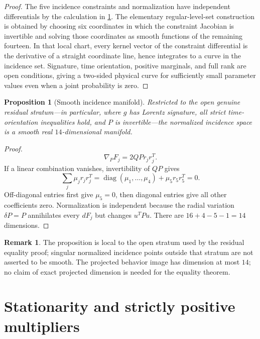 \documentclass[11pt]{article}
\newtheorem{proposition}[theorem]{Proposition}
\theoremstyle{definition}
\newtheorem{remark}[theorem]{Remark}
\begin{document}
\begin{proof}
The five incidence constraints and normalization have independent
differentials by the calculation in \cref{prop:smooth}. The elementary
regular-level-set construction is obtained by choosing six coordinates in
which the constraint Jacobian is invertible and solving those coordinates as
smooth functions of the remaining fourteen. In that local chart, every
kernel vector of the constraint differential is the derivative of a straight
coordinate line, hence integrates to a curve in the incidence set.
Signature, time orientation, positive marginals, and full rank are open
conditions, giving a two-sided physical curve for sufficiently small
parameter values even when a joint probability is zero.
\end{proof}

\begin{proposition}[Smooth incidence manifold]
\label{prop:smooth}
Restricted to the open genuine residual stratum---in particular, where
\(g\) has Lorentz signature, all strict time-orientation inequalities hold,
and \(P\) is invertible---the normalized incidence space is a smooth real
\(14\)-dimensional manifold.
\end{proposition}

\begin{proof}
\[
\nabla_PF_j=2QPr_jr_j^T.
\]
If a linear combination vanishes, invertibility of \(QP\) gives
\[
\sum_j\mu_jr_jr_j^T
=\operatorname{diag}(\mu_1,\ldots,\mu_4)+\mu_5r_5r_5^T=0.
\]
Off-diagonal entries first give \(\mu_5=0\), then diagonal entries give all
other coefficients zero. Normalization is independent because the radial
variation \(\delta P=P\) annihilates every \(dF_j\) but changes \(u^TPu\).
There are \(16+4-5-1=14\) dimensions.
\end{proof}

\begin{remark}
The proposition is local to the open stratum used by the residual equality
proof;
singular normalized incidence points outside that stratum are not asserted to
be smooth. The projected behavior image has dimension at most \(14\); no claim
of exact projected dimension is needed for the equality theorem.
\end{remark}

\section{Stationarity and strictly positive multipliers}
\label{sec:multipliers}
\end{document}
